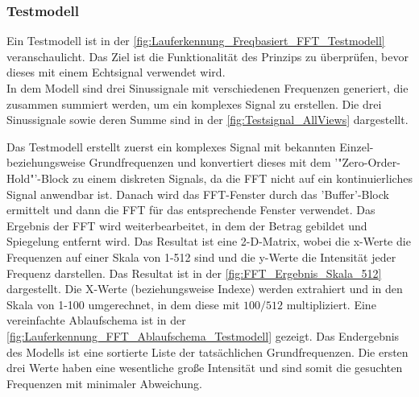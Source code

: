%

\subsubsection{Testmodell}
Ein Testmodell ist in der \autoref{fig:Lauferkennung_Freqbasiert_FFT_Testmodell} veranschaulicht. Das Ziel ist die Funktionalität des Prinzips zu überprüfen, bevor dieses mit einem Echtsignal verwendet wird.\\
In dem Modell sind drei Sinussignale mit verschiedenen Frequenzen generiert, die zusammen summiert werden, um ein komplexes Signal zu erstellen.
Die drei Sinussignale sowie deren Summe sind in der \autoref{fig:Testsignal_AllViews} dargestellt.

Das Testmodell erstellt zuerst ein komplexes Signal mit bekannten Einzel- beziehungsweise Grundfrequenzen und konvertiert dieses mit dem '"Zero-Order-Hold"'-Block zu einem diskreten Signals, da die FFT nicht auf ein kontinuierliches Signal anwendbar ist. Danach wird das FFT-Fenster durch das 'Buffer'-Block ermittelt und dann die FFT für das entsprechende Fenster verwendet. Das Ergebnis der FFT wird weiterbearbeitet, in dem der Betrag gebildet und Spiegelung entfernt wird. Das Resultat ist eine 2-D-Matrix, wobei die x-Werte die Frequenzen auf einer Skala von 1-512 sind und die y-Werte die Intensität jeder Frequenz darstellen. Das Resultat ist in der \autoref{fig:FFT_Ergebnis_Skala_512} dargestellt. Die X-Werte (beziehungsweise Indexe) werden extrahiert und in den Skala von 1-100 umgerechnet, in dem diese mit $100/512$ multipliziert. Eine vereinfachte Ablaufschema ist in der \autoref{fig:Lauferkennung_FFT_Ablaufschema_Testmodell} gezeigt.
Das Endergebnis des Modells ist eine sortierte Liste der tatsächlichen Grundfrequenzen. Die ersten drei Werte haben eine wesentliche große Intensität und sind somit die gesuchten Frequenzen mit minimaler Abweichung.

